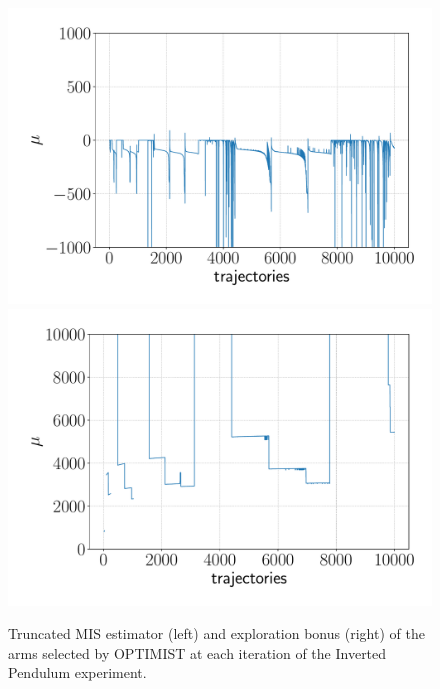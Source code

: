 \begin{figure}[t!] 
\centering
\includegraphics[width=.5\textwidth]{Images/IPmise.pdf}\hfill
\includegraphics[width=.5\textwidth]{Images/IPbonus.pdf}
\caption{Truncated \gls{MIS} estimator (left) and exploration bonus (right) of the arms selected by \gls{OPTIMIST} at each iteration of the Inverted Pendulum experiment.} 
\label{fig:IPbound}
\end{figure} 
